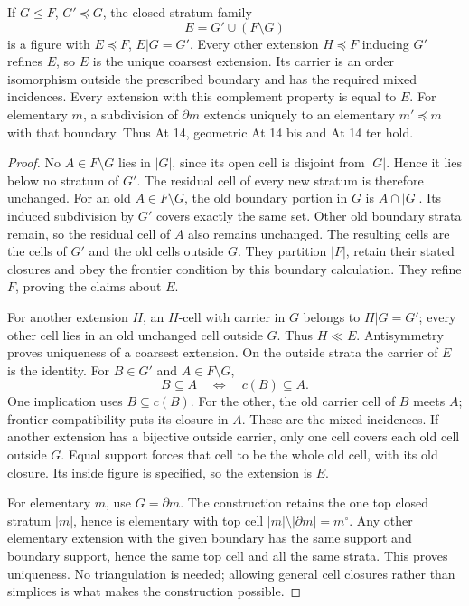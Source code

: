 \begin{theorem}\label{SA21-BM-cell-extension}
If \(G\leq F\), \(G'\preceq G\), the closed-stratum family
\[
 E=G'\cup(F\setminus G)
\]
is a figure with \(E\preceq F\), \(E|G=G'\).
Every other extension \(H\preceq F\) inducing \(G'\)
refines \(E\), so \(E\) is the unique coarsest extension.
Its carrier is an order isomorphism outside the
prescribed boundary and has the required mixed
incidences. Every extension with this complement
property is equal to \(E\).
For elementary \(m\), a subdivision of \(\partial m\)
extends uniquely to an elementary \(m'\preceq m\)
with that boundary. Thus At 14, geometric
At 14 bis and At 14 ter hold.
\end{theorem}

\begin{proof}
No \(A\in F\setminus G\) lies in \(|G|\),
since its open cell is disjoint from \(|G|\).
Hence it lies below no stratum of \(G'\).
The residual cell of every new stratum
is therefore unchanged. For an old
\(A\in F\setminus G\), the old boundary
portion in \(G\) is \(A\cap|G|\).
Its induced subdivision by \(G'\)
covers exactly the same set.
Other old boundary strata remain,
so the residual cell of \(A\)
also remains unchanged.
The resulting cells are the
cells of \(G'\) and the old
cells outside \(G\).
They partition \(|F|\), retain
their stated closures and obey
the frontier condition by this
boundary calculation. They
refine \(F\), proving the claims
about \(E\).

For another extension \(H\),
an \(H\)-cell with carrier
in \(G\) belongs to \(H|G=G'\);
every other cell lies in an
old unchanged cell outside
\(G\). Thus \(H\ll E\).
Antisymmetry proves uniqueness
of a coarsest extension.
On the outside strata the
carrier of \(E\) is the
identity. For \(B\in G'\)
and \(A\in F\setminus G\),
\[
 B\subseteq A\quad\Longleftrightarrow\quad c(B)\subseteq A.
\]
One implication uses \(B\subseteq c(B)\).
For the other, the old carrier
cell of \(B\) meets \(A\);
frontier compatibility puts
its closure in \(A\).
These are the mixed incidences.
If another extension has a
bijective outside carrier,
only one cell covers each
old cell outside \(G\).
Equal support forces that
cell to be the whole old
cell, with its old closure.
Its inside figure is specified,
so the extension is \(E\).

For elementary \(m\), use
\(G=\partial m\).
The construction retains
the one top closed stratum
\(|m|\), hence is elementary
with top cell
\(|m|\setminus|\partial m|=m^\circ\).
Any other elementary extension
with the given boundary has
the same support and boundary
support, hence the same top
cell and all the same strata.
This proves uniqueness.
No triangulation is needed;
allowing general cell closures
rather than simplices is
what makes the construction
possible.
\end{proof}

